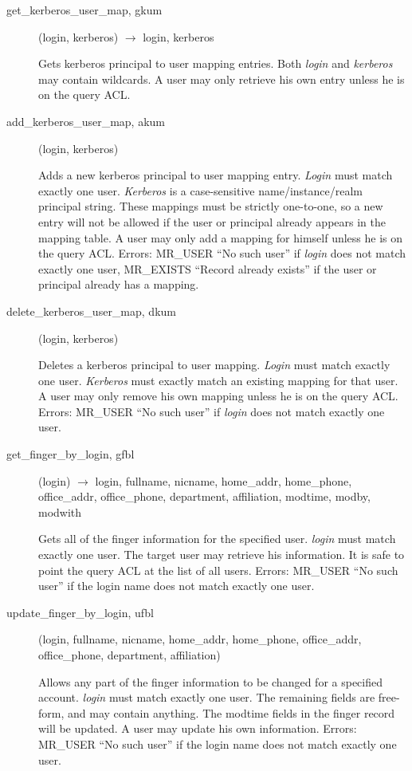 \documentclass{article}
\begin{document}
\begin{description}
\item[get\_kerberos\_user\_map, gkum](login, kerberos) $\rightarrow$ login,
kerberos

Gets kerberos principal to user mapping entries.  Both {\em login} and
{\em kerberos} may contain wildcards.  A user may only retrieve his own
entry unless he is on the query ACL.

\item[add\_kerberos\_user\_map, akum](login, kerberos)

Adds a new kerberos principal to user mapping entry.  {\em Login} must
match exactly one user.  {\em Kerberos} is a case-sensitive
name/instance/realm principal string.  These mappings must be strictly
one-to-one, so a new entry will not be allowed if the user or
principal already appears in the mapping table.  A user may only add a
mapping for himself unless he is on the query ACL.  Errors: MR\_USER
``No such user'' if {\em login} does not match exactly one user,
MR\_EXISTS ``Record already exists'' if the user or principal already
has a mapping.

\item[delete\_kerberos\_user\_map, dkum](login, kerberos)

Deletes a kerberos principal to user mapping.  {\em Login} must match
exactly one user.  {\em Kerberos} must exactly match an existing mapping
for that user.  A user may only remove his own mapping unless he is on
the query ACL.  Errors: MR\_USER ``No such user'' if {\em login} does not
match exactly one user.

\item[get\_finger\_by\_login, gfbl](login) $\rightarrow$ login, fullname, nicname,
home\_addr, home\_phone, office\_addr, office\_phone, department,
affiliation, modtime, modby, modwith

Gets all of the finger information for the specified user.  {\em login}
must match exactly one user.  The target user may retrieve his
information.  It is safe to point the query ACL at the list of all
users.  Errors: MR\_USER ``No such user'' if the login name does not
match exactly one user.

\item[update\_finger\_by\_login, ufbl](login, fullname, nicname, home\_addr,
home\_phone, office\_addr, office\_phone, department, affiliation)

Allows any part of the finger information to be changed for a
specified account.  {\em login} must match exactly one user.  The
remaining fields are free-form, and may contain anything.  The modtime
fields in the finger record will be updated.  A user may update his
own information.  Errors: MR\_USER ``No such user'' if the login name
does not match exactly one user.


\end{description}
\end{document}
